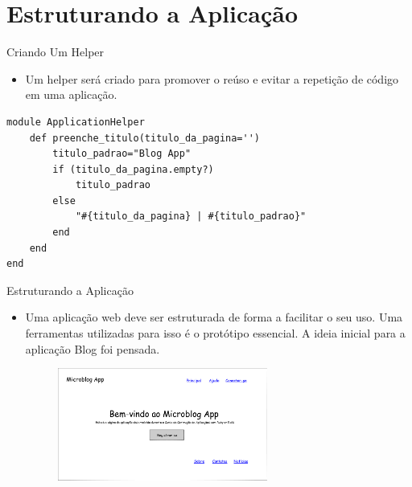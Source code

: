 \section{Estruturando a Aplicação}
\begin{frame}[fragile,t]{Criando Um Helper}
    \begin{itemize}
      \item  Um helper será criado para promover o reúso e evitar a repetição 
        de código em uma aplicação. 
    \end{itemize}
      \begin{lstlisting}[style=RubyInputStyle, basicstyle=\tiny\ttfamily, firstline=1, lastline=10, caption=app/helpers/application\_helper.rb]
module ApplicationHelper
    def preenche_titulo(titulo_da_pagina='')
        titulo_padrao="Blog App"
        if (titulo_da_pagina.empty?)
            titulo_padrao
        else
            "#{titulo_da_pagina} | #{titulo_padrao}"
        end
    end
end
      \end{lstlisting}
\end{frame} 
\begin{frame}[fragile,t]{Estruturando a Aplicação}
    \begin{itemize}
      \item  Uma aplicação web deve ser estruturada de forma a facilitar o seu uso.
        Uma ferramentas utilizadas para isso é o protótipo essencial. A ideia inicial
        para a aplicação Blog foi pensada. 
      \begin{figure}[h!]
        \centering
        \includegraphics[width=0.65\textwidth]{imagens/esboco-da-pagina-principal.png}
      \end{figure}
    \end{itemize}
\end{frame} 

